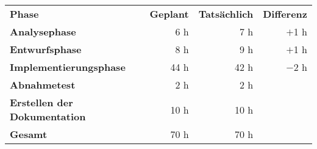 \begin{tabular}{lrrr}
\rowcolor{heading}\textbf{Phase} & \textbf{Geplant} & \textbf{Tatsächlich} & \textbf{Differenz} \\
\textbf{Analysephase} & 6 h   & 7 h  & $+$1 h \\
\rowcolor{odd}\textbf{Entwurfsphase} & 8 h  & 9 h  & $+$1 h \\
\textbf{Implementierungsphase} & 44 h  & 42 h  & $-$2 h \\
\rowcolor{odd}\textbf{Abnahmetest} & 2 h   & 2 h   &  \\
\textbf{Erstellen der Dokumentation} & 10 h   & 10 h  &  \\
\hline
\hline
\rowcolor{odd}\textbf{Gesamt} & 70 h  & 70 h  &  \\
\end{tabular}
